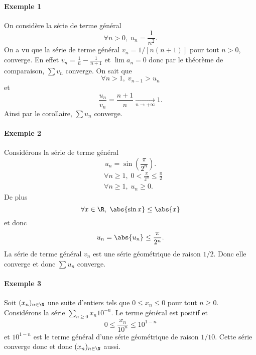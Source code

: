 
\paragraph{Exemple 1}On considère la série de terme général \[\forall n >0, \; u_n = \frac{1}{n^{2}}.\]
On a vu que la série de terme général $v_n = 1/[n(n+1)]$ pour tout $n>0$, converge. En effet $v_n = \frac{1}{n} - \frac{1}{n+1}$ et $\lim a_n= 0$ donc par le théorème de comparaison, $\sum v_n$ converge. On sait que \[\forall n > 1, \; v_{n-1} > u_n \]et \[ \frac{u_n}{v_n} = \frac{n+1}{n} \underset{n\to +\infty}{\longrightarrow} 1.\]Ainsi par le corollaire, $\sum u_n$ converge.

\paragraph{Exemple 2}Considérons la série de terme général \[u_n = \sin\left(\frac{\pi}{2^{n}}\right). \]
\begin{align*}
&\forall n \geq 1, \; 0 < \frac{\pi}{2^{n}}\leq \frac{\pi}{2}\\
&\forall n \geq 1, \; u_n \geq 0.
\end{align*}
De plus \[\forall x \in \R, \; \abs{\sin x}\leq \abs{x}\]et donc \[u_n = \abs{u_n}\leq \frac{\pi}{2^{n}}. \]La série de terme général $v_n$ est une série géométrique de raison $1/2$. Donc elle converge et donc $\sum u_n$ converge.

\paragraph{Exemple 3}Soit $(x_{n})_{n\in \N}$ une suite d'entiers tels que $0\leq x_n\leq 0$ pour tout $n\geq 0$. Considérons la série $\sum_{n\geq 0}x_n10^{-n}$. Le terme général est positif et \[ 0\leq \frac{x_n}{10^{n}} \leq 10^{1-n}\]et $10^{1-n}$ est le terme général d'une série géométrique de raison $1/10$. Cette série converge donc et donc $(x_n)_{n\in \N}$ aussi.


